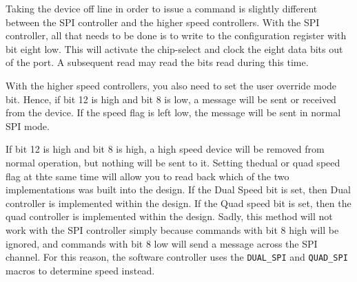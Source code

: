 \documentclass{gqtekspec}
\begin{document}
Taking the device off line in order to issue a command is slightly different
between the SPI controller and the higher speed controllers.  With the
SPI controller, all that needs to be done is to write to the configuration
register with bit eight low.  This will activate the chip-select and clock
the eight data bits out of the port.  A subsequent read may read the bits
read during this time.

With the higher speed controllers, you also need to set the user override
mode bit.  Hence, if bit 12 is high and bit 8 is low, a message will be
sent or received from the device.  If the speed flag is left low, the
message will be sent in normal SPI mode.
	
If bit 12 is high and bit 8 is high, a high speed device will be removed
from normal operation, but nothing will be sent to it.  Setting thedual or
quad speed flag at thte same time will allow you to read back which of the
two implementations was built into the design.  If the Dual Speed bit is set,
then Dual controller is implemented within the design.  If the Quad speed bit
is set, then the quad controller is implemented within the design.  Sadly,
this method will not work with the SPI controller simply because commands with
bit 8 high will be ignored, and commands with bit 8 low will send a message
across the SPI channel.  For this reason, the software controller
uses the {\tt DUAL\_SPI} and {\tt QUAD\_SPI} macros to determine speed
instead.
\end{document}
